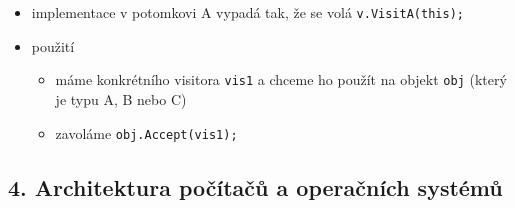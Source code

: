 \begin{itemize}
\begin{itemize}
\begin{itemize}
\item implementace v potomkovi A vypadá tak, že se volá \texttt{v.\allowbreak{}VisitA(\allowbreak{}this)\allowbreak{};\allowbreak{}}
\item použití
\begin{itemize}
\item máme konkrétního visitora \texttt{vis1} a chceme ho použít na objekt \texttt{obj} (který je typu A, B nebo C)
\item zavoláme \texttt{obj.\allowbreak{}Accept(\allowbreak{}vis1)\allowbreak{};\allowbreak{}}
\end{itemize}
\end{itemize}
\end{itemize}
\end{itemize}
\subsection{4. Architektura počítačů a operačních systémů}
